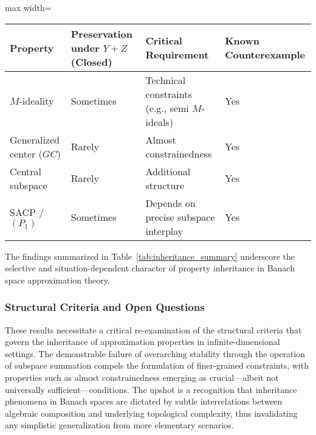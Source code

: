 \documentclass[sigconf]{acmart}
\begin{document}
\begin{table*}[htbp]
\centering
\caption{Summary of Stability and Inheritance for Key Properties under Subspace Sum}
\label{tab:inheritance_summary}
\begin{adjustbox}{max width=\textwidth}
\begin{tabular}{llll}
\toprule
\textbf{Property} & \textbf{Preservation under $Y+Z$ (Closed)} & \textbf{Critical Requirement} & \textbf{Known Counterexample} \\
\midrule
$M$-ideality        & Sometimes                    & Technical constraints (e.g., semi $M$-ideals)   & Yes \\
Generalized center ($GC$)   & Rarely                       & Almost constrainedness                        & Yes \\
Central subspace    & Rarely                       & Additional structure                           & Yes \\
SACP / $(P_1)$      & Sometimes                    & Depends on precise subspace interplay          & Yes \\
\bottomrule
\end{tabular}
\end{adjustbox}
\end{table*}

The findings summarized in Table~\ref{tab:inheritance_summary} underscore the selective and situation-dependent character of property inheritance in Banach space approximation theory.

\subsubsection{Structural Criteria and Open Questions}

These results necessitate a critical re-examination of the structural criteria that govern the inheritance of approximation properties in infinite-dimensional settings. The demonstrable failure of overarching stability through the operation of subspace summation compels the formulation of finer-grained constraints, with properties such as almost constrainedness emerging as crucial—albeit not universally sufficient—conditions. The upshot is a recognition that inheritance phenomena in Banach spaces are dictated by subtle interrelations between algebraic composition and underlying topological complexity, thus invalidating any simplistic generalization from more elementary scenarios.
\end{document}
